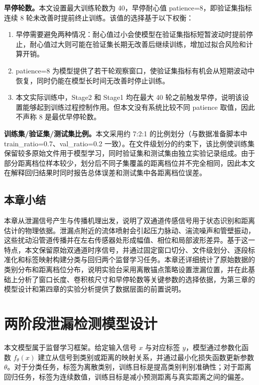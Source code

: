 \textbf{早停轮数。}本文设置最大训练轮数为 40，早停耐心值 patience=8，即验证集指标连续 8 轮未改善时提前终止训练。该值的选择基于以下权衡：

\begin{enumerate}
  \item 早停需要避免两种情况：耐心值过小会使模型在验证集指标短暂波动时提前停止，耐心值过大则可能在验证集长期无改善后继续训练，增加过拟合风险和计算开销。
  \item patience=8 为模型提供了若干轮观察窗口，使验证集指标有机会从短期波动中恢复，同时仍能在模型长时间无改善时停止训练。
  \item 本文实际训练中，Stage2 和 Stage1 均在最大 40 轮之前触发早停，说明该设置能够起到训练过程控制作用。但本文没有系统比较不同 patience 取值，因此不声称 8 是最优早停轮数。
\end{enumerate}

\textbf{训练集/验证集/测试集比例。}本文采用约 7:2:1 的比例划分（与数据准备脚本中 train\_ratio=0.7、val\_ratio=0.2 一致）。在文件级划分的约束下，该比例使训练集保留较多原始文件用于模型学习，同时验证集和测试集由独立实验记录组成。由于部分距离档位样本较少，划分后不同子集覆盖的距离档位并不完全相同，因此本文在解释回归结果时同时报告总体误差和测试集中各距离档位误差。

\section{本章小结}

本章从泄漏信号产生与传播机理出发，说明了双通道传感信号用于状态识别和距离估计的物理依据。泄漏点附近的流体喷射会引起压力脉动、湍流噪声和管壁振动，这些扰动沿管道传播并在左右传感器处形成幅值、相位和局部波形差异。基于这一特点，本文保留原始双通道时序信号，并通过固定窗口切分、文件级划分、逐段标准化和标签映射构建分类与回归两个监督学习任务。本章还详细统计了原始数据的类别分布和距离档位分布，说明实验台采用离散锚点策略设置泄漏位置，并在此基础上分析了窗口长度、卷积核尺寸和早停轮数等关键参数的选择依据，为第三章的模型设计和第四章的实验分析提供了数据层面的前置说明。

\chapter{两阶段泄漏检测模型设计}

本文模型属于监督学习框架。给定输入信号 $x$ 与对应标签 $y$，模型通过参数化函数 $f_{\theta}(x)$ 建立从信号到类别或距离的映射关系，并通过最小化损失函数更新参数 $\theta$。对于分类任务，标签为离散类别，训练目标是提高类别判别准确性；对于距离回归任务，标签为连续数值，训练目标是减小预测距离与真实距离之间的偏差。

